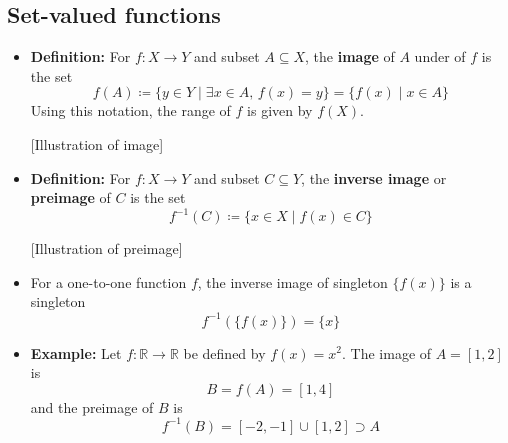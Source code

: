 \documentclass[11pt,twoside]{report}
\newcommand{\bbR}{{\mathbb{R}}}
\begin{document}
 \subsection{Set-valued functions}
 \begin{itemize}

\item \textbf{Definition:} For $f \colon X \to Y$ and subset $A \subseteq X$, the \textbf{image} of $A$ under of $f$ is the set
\[
f(A) \coloneqq \{ y \in Y \mid \exists x \in A, \,   f(x) = y\}  = \{ f(x) \mid x \in A\} 
\]
Using this notation,  the range of $f$ is given by $f(X)$. 

\begin{center}
[Illustration of image]
\vspace*{.2in}
\end{center}


\item \textbf{Definition:} For $f \colon X \to Y$ and subset $C \subseteq Y$, the \textbf{inverse image} or \textbf{preimage} of $C$ is the set
\[
f^{-1}(C) \coloneqq \{ x \in X  \mid f(x) \in C\} 
\]


\begin{center}
[Illustration of preimage]
\vspace*{.2in}
\end{center}


\item For a one-to-one function $f$, the inverse image of singleton $\{f(x)\}$ is a singleton
\[
f^{-1}( \{ f(x)\}) = \{ x\} 
\]



\item \textbf{Example:} Let $f \colon \bbR \to \bbR$ be defined by $f(x) = x^2$. The image of $A = [1, 2]$ is 
\[
B = f(A) = [1,4]
\]
and the preimage of $B$ is 
\[
f^{-1}(B)  =  [-2,-1] \cup [1,2] \supset A
\]


\end{itemize}
\end{document}
